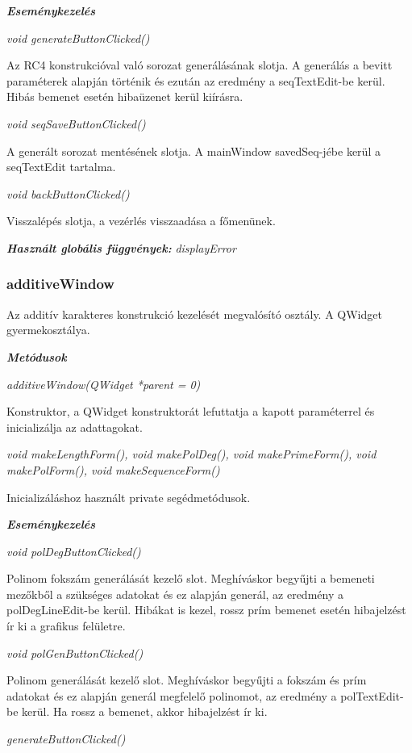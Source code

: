 \documentclass[hidelinks, 12pt]{article}
\begin{document}
\textit{\textbf{Eseménykezelés}}

\textit{void generateButtonClicked()}

Az RC4 konstrukcióval való sorozat generálásának slotja. A generálás a bevitt paraméterek alapján történik és ezután az eredmény a seqTextEdit-be kerül. Hibás bemenet esetén hibaüzenet kerül kiírásra.

\textit{void seqSaveButtonClicked()}

A generált sorozat mentésének slotja. A mainWindow savedSeq-jébe kerül a seqTextEdit tartalma.

\textit{void backButtonClicked()}

Visszalépés slotja, a vezérlés visszaadása a főmenünek.

\textit{\textbf{Használt globális függvények: }}\textit{displayError}

\subsubsection*{additiveWindow}

Az additív karakteres konstrukció kezelését megvalósító osztály. A QWidget gyermekosztálya.

\textbf{\textit{Metódusok}}

\textit{additiveWindow(QWidget *parent = 0)}

Konstruktor, a QWidget konstruktorát lefuttatja a kapott paraméterrel és inicializálja az adattagokat.

\textit{void makeLengthForm(), void makePolDeg(), void makePrimeForm(), void makePolForm(), void makeSequenceForm()}

Inicializáláshoz használt private segédmetódusok.

\textbf{\textit{Eseménykezelés}}

\textit{void polDegButtonClicked()}

Polinom fokszám generálását kezelő slot. Meghíváskor begyűjti a bemeneti mezőkből a szükséges adatokat és ez alapján generál, az eredmény a polDegLineEdit-be kerül.
Hibákat is kezel, rossz prím bemenet esetén hibajelzést ír ki a grafikus felületre.

\textit{void polGenButtonClicked()}

Polinom generálását kezelő slot. Meghíváskor begyűjti a fokszám és prím adatokat és ez alapján generál megfelelő polinomot, az eredmény a polTextEdit-be kerül. Ha rossz a bemenet, akkor hibajelzést ír ki.

\textit{generateButtonClicked()}
\end{document}
